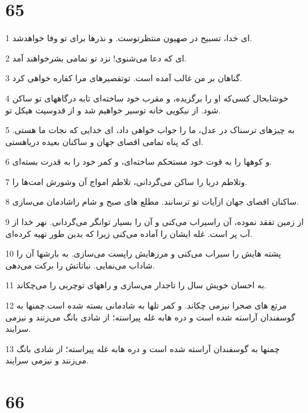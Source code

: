 \chapter{65}

\par 1 ای خدا، تسبیح در صهیون منتظرتوست. و نذرها برای تو وفا خواهدشد.
\par 2 ‌ای که دعا می‌شنوی! نزد تو تمامی بشرخواهند آمد.
\par 3 گناهان بر من غالب آمده است. توتقصیرهای مرا کفاره خواهی کرد.
\par 4 خوشابحال کسی‌که او را برگزیده، و مقرب خود ساخته‌ای تابه درگاههای تو ساکن شود. از نیکویی خانه توسیر خواهیم شد و از قدوسیت هیکل تو.
\par 5 به چیزهای ترسناک در عدل، ما را جواب خواهی داد، ای خدایی که نجات ما هستی. ای که پناه تمامی اقصای جهان و ساکنان بعیده دریاهستی.
\par 6 و کوهها را به قوت خود مستحکم ساخته‌ای، و کمر خود را به قدرت بسته‌ای.
\par 7 وتلاطم دریا را ساکن می‌گردانی، تلاطم امواج آن وشورش امت‌ها را.
\par 8 ساکنان اقصای جهان ازآیات تو ترسانند. مطلع های صبح و شام راشادمان می‌سازی.
\par 9 از زمین تفقد نموده، آن راسیراب می‌کنی و آن را بسیار توانگر می‌گردانی. نهر خدا از آب پر است. غله ایشان را آماده می‌کنی زیرا که بدین طور تهیه کرده‌ای.
\par 10 پشته هایش را سیراب می‌کنی و مرزهایش راپست می‌سازی. به بارشها آن را شاداب می‌نمایی. نباتاتش را برکت می‌دهی.
\par 11 به احسان خویش سال را تاجدار می‌سازی و راههای توچربی را می‌چکاند.
\par 12 مرتع های صحرا نیزمی چکاند. و کمر تلها به شادمانی بسته شده است.چمنها به گوسفندان آراسته شده است و دره هابه غله پیراسته؛ از شادی بانگ می‌زنند و نیزمی سرایند.
\par 13 چمنها به گوسفندان آراسته شده است و دره هابه غله پیراسته؛ از شادی بانگ می‌زنند و نیزمی سرایند.
 
\chapter{66}

